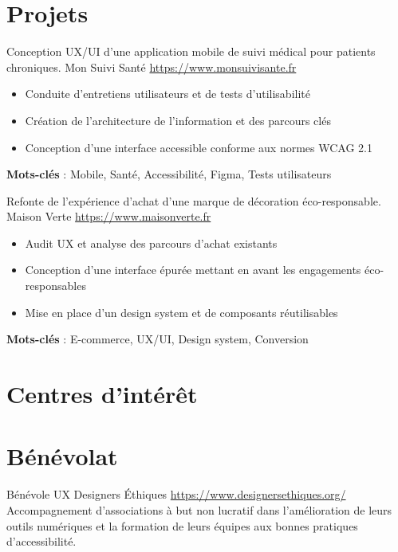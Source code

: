 \documentclass[a4paper, serif, 10pt]{moderncv}
\begin{document}
\section{Projets}

        {Conception UX/UI d'une application mobile de suivi médical pour patients chroniques.}
        {Mon Suivi Santé}
        {\url{https://www.monsuivisante.fr}}
        {}
        {\begin{itemize}
\item Conduite d'entretiens utilisateurs et de tests d'utilisabilité
\item Création de l'architecture de l'information et des parcours clés
\item Conception d'une interface accessible conforme aux normes WCAG 2.1
\end{itemize}
\textbf{Mots-clés} : Mobile, Santé, Accessibilité, Figma, Tests utilisateurs}

        {Refonte de l'expérience d'achat d'une marque de décoration éco-responsable.}
        {Maison Verte}
        {\url{https://www.maisonverte.fr}}
        {}
        {\begin{itemize}
\item Audit UX et analyse des parcours d'achat existants
\item Conception d'une interface épurée mettant en avant les engagements éco-responsables
\item Mise en place d'un design system et de composants réutilisables
\end{itemize}
\textbf{Mots-clés} : E-commerce, UX/UI, Design system, Conversion}
\section{Centres d'intérêt}

\section{Bénévolat}

        {Bénévole UX}
        {Designers Éthiques}
        {\url{https://www.designersethiques.org/}}
        {}
        {Accompagnement d'associations à but non lucratif dans l'amélioration de leurs outils numériques et la formation de leurs équipes aux bonnes pratiques d'accessibilité.}
    
\end{document}
